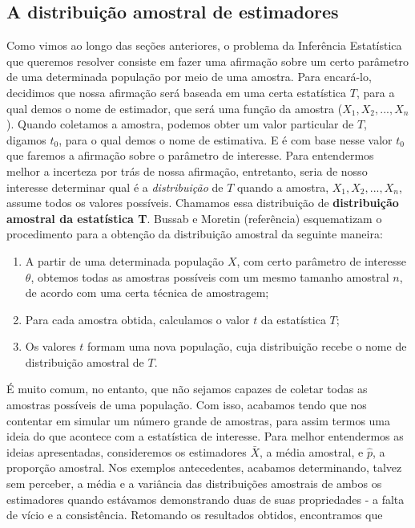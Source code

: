 \documentclass[
  letterpaper,
  DIV=11,
  numbers=noendperiod]{scrreprt}
\begin{document}
\hypertarget{a-distribuiuxe7uxe3o-amostral-de-estimadores}{%
\subsection{A distribuição amostral de
estimadores}\label{a-distribuiuxe7uxe3o-amostral-de-estimadores}}

Como vimos ao longo das seções anteriores, o problema da Inferência
Estatística que queremos resolver consiste em fazer uma afirmação sobre
um certo parâmetro de uma determinada população por meio de uma amostra.
Para encará-lo, decidimos que nossa afirmação será baseada em uma certa
estatística \(T\), para a qual demos o nome de estimador, que será uma
função da amostra (\(X_1, X_2, ..., X_n\)). Quando coletamos a amostra,
podemos obter um valor particular de \(T\), digamos \(t_0\), para o qual
demos o nome de estimativa. E é com base nesse valor \(t_0\) que faremos
a afirmação sobre o parâmetro de interesse. Para entendermos melhor a
incerteza por trás de nossa afirmação, entretanto, seria de nosso
interesse determinar qual é a \emph{distribuição} de \(T\) quando a
amostra, \(X_1, X_2, ..., X_n\), assume todos os valores possíveis.
Chamamos essa distribuição de \textbf{distribuição amostral da
estatística T}. Bussab e Moretin (referência) esquematizam o
procedimento para a obtenção da distribuição amostral da seguinte
maneira:

\begin{enumerate}
\def\labelenumi{\arabic{enumi}.}
\item
  A partir de uma determinada população \(X\), com certo parâmetro de
  interesse \(\theta\), obtemos todas as amostras possíveis com um mesmo
  tamanho amostral \(n\), de acordo com uma certa técnica de amostragem;
\item
  Para cada amostra obtida, calculamos o valor \(t\) da estatística
  \(T\);
\item
  Os valores \(t\) formam uma nova população, cuja distribuição recebe o
  nome de distribuição amostral de \(T\).
\end{enumerate}

É muito comum, no entanto, que não sejamos capazes de coletar todas as
amostras possíveis de uma população. Com isso, acabamos tendo que nos
contentar em simular um número grande de amostras, para assim termos uma
ideia do que acontece com a estatística de interesse. Para melhor
entendermos as ideias apresentadas, consideremos os estimadores
\(\bar{X}\), a média amostral, e \(\hat{p}\), a proporção amostral. Nos
exemplos antecedentes, acabamos determinando, talvez sem perceber, a
média e a variância das distribuições amostrais de ambos os estimadores
quando estávamos demonstrando duas de suas propriedades - a falta de
vício e a consistência. Retomando os resultados obtidos, encontramos que
\end{document}
